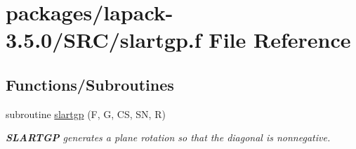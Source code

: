 \hypertarget{slartgp_8f}{}\section{packages/lapack-\/3.5.0/\+S\+R\+C/slartgp.f File Reference}
\label{slartgp_8f}
\subsection*{Functions/\+Subroutines}
\begin{DoxyCompactItemize}
\item 
subroutine \hyperlink{group__auxOTHERauxiliary_gaf196d96b7826d09326521d4a30b4bca4}{slartgp} (F, G, C\+S, S\+N, R)
\begin{DoxyCompactList}\small\item\em {\bfseries S\+L\+A\+R\+T\+G\+P} generates a plane rotation so that the diagonal is nonnegative. \end{DoxyCompactList}\end{DoxyCompactItemize}
